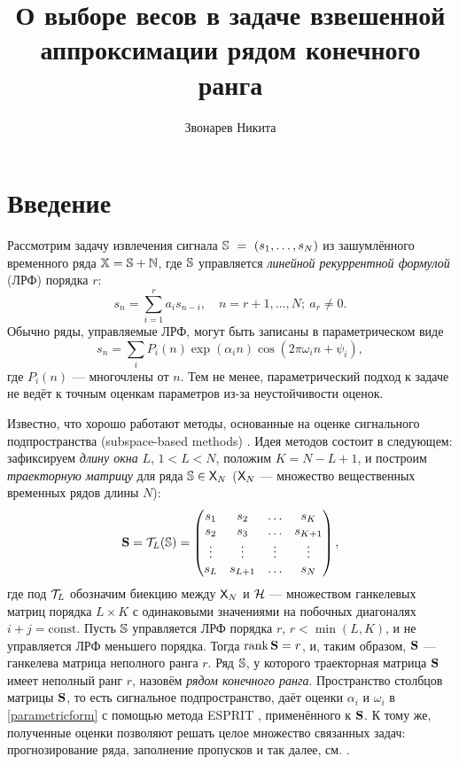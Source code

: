 \documentclass[10pt]{article}
\author{Звонарев Никита}
\title{О выборе весов в задаче взвешенной аппроксимации рядом конечного ранга}
\def\rank{\mathop{\mathrm{rank}}}
\begin{document}
\maketitle

\section*{Введение}
Рассмотрим задачу извлечения сигнала $\mathbb{S}~=~(s_1, \ldots, s_N)$ из зашумлённого временного ряда $\mathbb{X} = \mathbb{S} + \mathbb{N}$, где $\mathbb{S}$ управляется \emph{линейной рекуррентной формулой} (ЛРФ) порядка $r$:
\begin{equation*}
s_n = \sum_{i = 1}^{r} a_i s_{n-i}, \quad n = r + 1, \ldots, N;\  a_r\neq 0.
\end{equation*}
Обычно ряды, управляемые ЛРФ, могут быть записаны в параметрическом виде
\begin{equation} \label{parametricform}
s_n = \sum_i P_i(n) \exp(\alpha_i n) \cos(2 \pi \omega_i n + \psi_i),
\end{equation}
где $P_i(n)$ --- многочлены от $n$. Тем не менее, параметрический подход к задаче не ведёт к точным оценкам параметров из-за неустойчивости оценок.

Известно, что хорошо работают методы, основанные на оценке сигнального подпространства (subspace-based methods) \cite{Broomhead.King1986, Vautard.etal1992, Elsner.Tsonis1996, Golyandina.etal2001}. Идея методов состоит в следующем: зафиксируем \emph{длину окна} $L$, $1 < L < N$, положим $K = N - L + 1$, и построим \emph{траекторную матрицу} для ряда $\mathbb{S} \in \mathsf{X}_N$ ($\mathsf{X}_N$ --- множество вещественных временных рядов длины $N$):
\begin{equation*}
\mathbf{S} = \mathcal{T}_L(\mathbb{S}) =  \begin{pmatrix}
s_1 & s_2 & \ldots & s_K \\
s_2 & s_3 & \ldots & s_{K + 1} \\
\vdots & \vdots & \vdots & \vdots \\
s_L & s_{L + 1} & \ldots & s_N
\end{pmatrix},
\end{equation*}
где под $\mathcal{T}_L$ обозначим биекцию между $\mathsf{X}_N$ и $\mathcal{H}$ --- множеством ганкелевых матриц порядка $L \times K$ с одинаковыми значениями на побочных диагоналях $i+j=\mathrm{const}$.
Пусть $\mathbb{S}$ управляется ЛРФ порядка $r$, $r < \min(L, K)$, и не управляется ЛРФ меньшего порядка. Тогда $\rank \bfS = r$, и, таким образом, $\mathbf{S}$ --- ганкелева матрица неполного ранга $r$. Ряд $\mathbb{S}$, у которого траекторная матрица $\mathbf{S}$ имеет неполный ранг $r$, назовём \emph{рядом конечного ранга}. Пространство столбцов матрицы $\mathbf{S}$, то есть сигнальное подпространство, даёт оценки $\alpha_i$ и $\omega_i$ в \eqref{parametricform} с помощью метода ESPRIT \cite{Roy.Kailath1989, Golyandina.Zhigljavsky2012}, применённого к $\mathbf{S}$. К тому же, полученные оценки позволяют решать целое множество связанных задач: прогнозирование ряда, заполнение пропусков и так далее, см. \cite{Golyandina.etal2001}.
\end{document}

